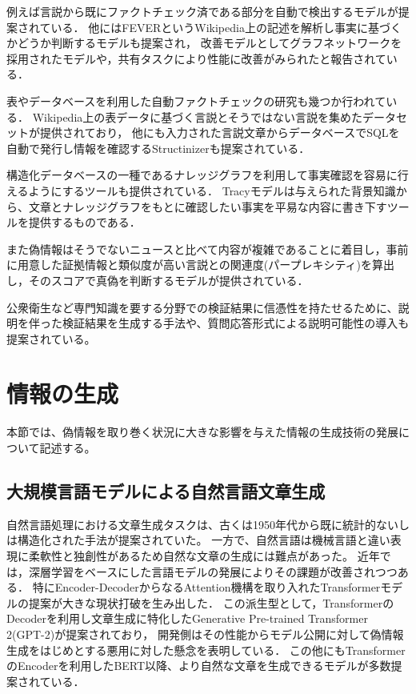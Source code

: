 例えば言説から既にファクトチェック済である部分を自動で検出するモデル\cite{shaar-etal-2020-known}が提案されている．
他にはFEVERというWikipedia上の記述を解析し事実に基づくかどうか判断するモデルも提案され\cite{thorne-etal-2018-fever}，
改善モデルとしてグラフネットワークを採用されたモデル\cite{zhong-etal-2020-reasoning}や，共有タスクにより性能に改善がみられたと報告されている\cite{thorne-etal-2019-fever2}．

表やデータベースを利用した自動ファクトチェックの研究も幾つか行われている．
Wikipedia上の表データに基づく言説とそうではない言説を集めたデータセットが提供されており\cite{chen2020tabfact}，
他にも入力された言説文章からデータベースでSQLを自動で発行し情報を確認するStructinizer\cite{10.14778/3407790.3407841}も提案されている．

構造化データベースの一種であるナレッジグラフを利用して事実確認を容易に行えるようにするツールも提供されている．
Tracyモデルは与えられた背景知識から、文章とナレッジグラフをもとに確認したい事実を平易な内容に書き下すツールを提供するものである\cite{10.1145/3308558.3314126}．

また偽情報はそうでないニュースと比べて内容が複雑であることに着目し，事前に用意した証拠情報と類似度が高い言説との関連度(パープレキシティ)を算出し，そのスコアで真偽を判断するモデルが提供されている\cite{lee2020misinformation}．

公衆衛生など専門知識を要する分野での検証結果に信憑性を持たせるために、説明を伴った検証結果を生成する手法\cite{kotonya-toni-2020-explainable-automated}や、質問応答形式による説明可能性の導入\cite{9747214}も提案されている。


\section{情報の生成}
本節では、偽情報を取り巻く状況に大きな影響を与えた情報の生成技術の発展について記述する。

\subsection{大規模言語モデルによる自然言語文章生成}
自然言語処理における文章生成タスクは、古くは1950年代から既に統計的ないしは構造化された手法\cite{Fine1998,10.1162/089120102762671972}が提案されていた。
一方で、自然言語は機械言語と違い表現に柔軟性と独創性があるため自然な文章の生成には難点があった。
近年では，深層学習をベースにした言語モデルの発展によりその課題が改善されつつある．
特にEncoder-DecoderからなるAttention機構を取り入れたTransformerモデルの提案\cite{NIPS2017_3f5ee243}が大きな現状打破を生み出した．
この派生型として，TransformerのDecoderを利用し文章生成に特化したGenerative Pre-trained Transformer 2(GPT-2)が提案\cite{Radford_GPT2}されており，
開発側はその性能からモデル公開に対して偽情報生成をはじめとする悪用に対した懸念を表明している\cite{solaiman_clark_brundage_2020}．
この他にもTransformerのEncoderを利用したBERT\cite{devlin2019bert}以降、より自然な文章を生成できるモデルが多数提案されている．

